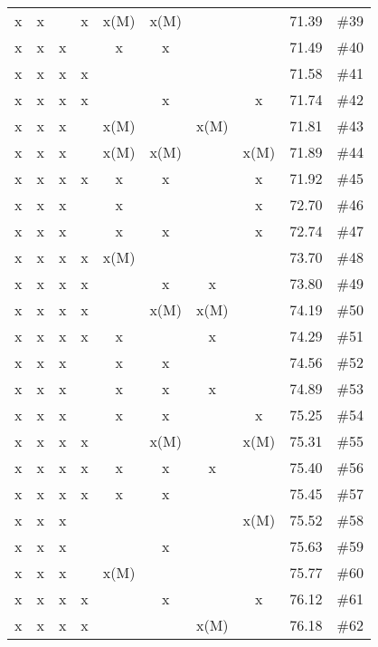 \begin{longtable}{|c|c|c|c|c|c|c|c|c|c|}
 x    & x    &      & x    & x(M) & x(M) &      &      & 71.39 & \#39 \\
 x    & x    & x    &      & x    & x    &      &      & 71.49 & \#40 \\
 x    & x    & x    & x    &      &      &      &      & 71.58 & \#41 \\
 x    & x    & x    & x    &      & x    &      & x    & 71.74 & \#42 \\
 x    & x    & x    &      & x(M) &      & x(M) &      & 71.81 & \#43 \\
 x    & x    & x    &      & x(M) & x(M) &      & x(M) & 71.89 & \#44 \\
 x    & x    & x    & x    & x    & x    &      & x    & 71.92 & \#45 \\
 x    & x    & x    &      & x    &      &      & x    & 72.70 & \#46 \\
 x    & x    & x    &      & x    & x    &      & x    & 72.74 & \#47 \\
 x    & x    & x    & x    & x(M) &      &      &      & 73.70 & \#48 \\
 x    & x    & x    & x    &      & x    & x    &      & 73.80 & \#49 \\
 x    & x    & x    & x    &      & x(M) & x(M) &      & 74.19 & \#50 \\
 x    & x    & x    & x    & x    &      & x    &      & 74.29 & \#51 \\
 x    & x    & x    &      & x    & x    &      &      & 74.56 & \#52 \\
 x    & x    & x    &      & x    & x    & x    &      & 74.89 & \#53 \\
 x    & x    & x    &      & x    & x    &      & x    & 75.25 & \#54 \\
 x    & x    & x    & x    &      & x(M) &      & x(M) & 75.31 & \#55 \\
 x    & x    & x    & x    & x    & x    & x    &      & 75.40 & \#56 \\
 x    & x    & x    & x    & x    & x    &      &      & 75.45 & \#57 \\
 x    & x    & x    &      &      &      &      & x(M) & 75.52 & \#58 \\
 x    & x    & x    &      &      & x    &      &      & 75.63 & \#59 \\
 x    & x    & x    &      & x(M) &      &      &      & 75.77 & \#60 \\
 x    & x    & x    & x    &      & x    &      & x    & 76.12 & \#61 \\
 x    & x    & x    & x    &      &      & x(M) &      & 76.18 & \#62 \\

\end{longtable}
